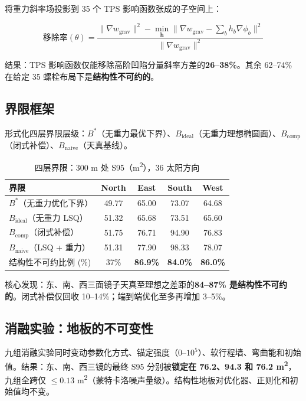 \documentclass[12pt,a4paper]{ctexart}
\begin{document}
将重力斜率场投影到 35 个 TPS 影响函数张成的子空间上：

\begin{equation}
\text{移除率}(\theta) =
\frac{\|\nabla w_{\text{grav}}\|^2 - \min_{\mathbf{h}}\|\nabla w_{\text{grav}} - \sum_b h_b \nabla\phi_b\|^2}
{\|\nabla w_{\text{grav}}\|^2}
\label{eq:removal}
\end{equation}

结果：TPS 影响函数仅能移除高阶凹陷分量斜率方差的\textbf{26--38\%}。其余 62--74\% 在给定 35 螺栓布局下是\textbf{结构性不可约的}。

\subsection{界限框架}

形式化四层界限层级：$B^*$（无重力最优下界）、$B_{\text{ideal}}$（无重力理想椭圆面）、$B_{\text{comp}}$（闭式补偿）、$B_{\text{naive}}$（天真基线）。

\begin{table}[t]
\centering
\caption{四层界限：300 m 处 S95（m\textsuperscript{2}），36 太阳方向}
\label{tab:bounds}
\small
\begin{tabular}{lcccc}
\toprule
界限 & North & East & South & West \\
\midrule
$B^*$（无重力优化下界） & 49.77 & 65.00 & 73.07 & 64.68 \\
$B_{\text{ideal}}$（无重力 LSQ） & 51.32 & 65.68 & 73.51 & 65.60 \\
$B_{\text{comp}}$（闭式补偿）  & 51.75 & 76.71 & 94.90 & 76.83 \\
$B_{\text{naive}}$（LSQ + 重力）    & 51.31 & 77.90 & 98.33 & 78.07 \\
\midrule
结构性不可约比例 (\%) & 37\% & \textbf{86.9\%} & \textbf{84.0\%} & \textbf{86.0\%} \\
\bottomrule
\end{tabular}
\end{table}

核心发现：东、南、西三面镜子天真至理想之差距的\textbf{84--87\% 是结构性不可约的}。闭式补偿仅回收 10--14\%；端到端优化至多再增加 3--5\%。

\subsection{消融实验：地板的不可变性}

九组消融实验同时变动参数化方式、锚定强度（0--$10^5$）、软行程墙、弯曲能和初始值。结果：东、南、西三镜的最终 S95 分别被\textbf{锁定在 76.2、94.3 和 76.2 m\textsuperscript{2}}，九组全跨仅 $\le 0.13$ m\textsuperscript{2}（蒙特卡洛噪声量级）。结构性地板对优化器、正则化和初始值均不变。
\end{document}
